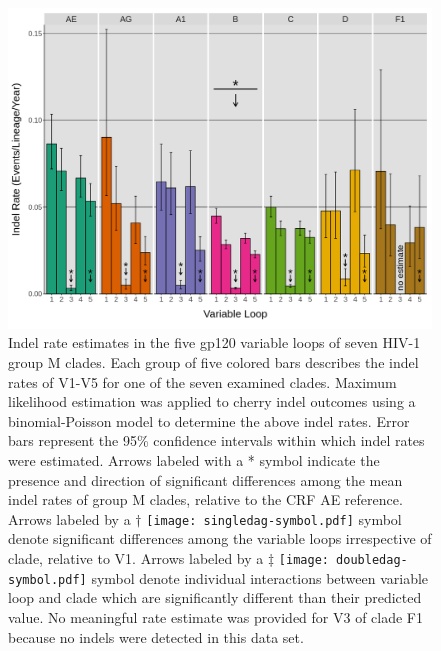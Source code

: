 \documentclass[12pt]{article}
\newcommand*{\doubledag}[2]{\texttt{[image: doubledag-symbol.pdf]}} %
\newcommand*{\singledag}[2]{\texttt{[image: singledag-symbol.pdf]}} %
\providecommand{\DIFadd}[1]{{\protect\color{blue}\uwave{#1}}} %
\providecommand{\DIFdel}[1]{{\protect\color{red}\sout{#1}}}                      %
\providecommand{\DIFaddFL}[1]{\DIFadd{#1}} %
\providecommand{\DIFdelFL}[1]{\DIFdel{#1}} %
\providecommand{\DIFaddbeginFL}{} %
\providecommand{\DIFaddendFL}{} %
\providecommand{\DIFdelbeginFL}{} %
\providecommand{\DIFdelendFL}{} %
\newcommand{\DIFscaledelfig}{0.5}
\newlength{\DIFdelgraphicswidth} %
\newlength{\DIFdelgraphicsheight} %
\newcommand{\DIFaddincludegraphics}[2][]{{\color{blue}\fbox{\DIFOincludegraphics[#1]{#2}}}} %
\newcommand{\DIFdelincludegraphics}[2][]{%
\sbox{\DIFdelgraphicsbox}{\DIFOincludegraphics[#1]{#2}}%
\settoboxwidth{\DIFdelgraphicswidth}{\DIFdelgraphicsbox} %
\settoboxtotalheight{\DIFdelgraphicsheight}{\DIFdelgraphicsbox} %
\scalebox{\DIFscaledelfig}{%
\parbox[b]{\DIFdelgraphicswidth}{\usebox{\DIFdelgraphicsbox}\\[-\baselineskip] \rule{\DIFdelgraphicswidth}{0em}}\llap{\resizebox{\DIFdelgraphicswidth}{\DIFdelgraphicsheight}{%
\setlength{\unitlength}{\DIFdelgraphicswidth}%
\begin{picture}(1,1)%
\thicklines\linethickness{2pt} %
{\color[rgb]{1,0,0}\put(0,0){\framebox(1,1){}}}%
{\color[rgb]{1,0,0}\put(0,0){\line( 1,1){1}}}%
{\color[rgb]{1,0,0}\put(0,1){\line(1,-1){1}}}%
\end{picture}%
}\hspace*{3pt}}} %
} %
\DeclareRobustCommand{\DIFaddbeginFL}{\DIFOaddbeginFL \let\includegraphics\DIFaddincludegraphics} %
\DeclareRobustCommand{\DIFaddendFL}{\DIFOaddendFL \let\includegraphics\DIFOincludegraphics} %
\DeclareRobustCommand{\DIFdelbeginFL}{\DIFOdelbeginFL \let\includegraphics\DIFdelincludegraphics} %
\DeclareRobustCommand{\DIFdelendFL}{\DIFOaddendFL \let\includegraphics\DIFOincludegraphics} %
\begin{document}
\begin{figure}[htbp]
    \centering
    \includegraphics[width=.85\textwidth]{indel-rates}
    \caption{ 
    Indel rate estimates in the five gp120 variable loops of seven HIV-1 group M clades. 
    Each group of five colored bars describes the indel rates of V1-V5 for one of the seven examined clades. 
    Maximum likelihood estimation was applied to cherry indel outcomes using a binomial-Poisson model to determine the above indel rates. 
    Error bars represent the 95\% confidence intervals within which indel rates were estimated. 
    Arrows labeled with a * symbol indicate the presence and direction of significant differences among the mean indel rates of group M clades, relative to the CRF \DIFaddbeginFL \DIFaddFL{01\_}\DIFaddendFL AE reference. 
    Arrows labeled by a \DIFdelbeginFL \DIFdelFL{$\dagger$ }\DIFdelendFL \DIFaddbeginFL \protect\singledag{2.9mm}{2.8mm} \DIFaddendFL symbol denote significant differences among the variable loops irrespective of clade, relative to V1.  
    Arrows labeled by a \DIFdelbeginFL \DIFdelFL{$\ddagger$ }\DIFdelendFL \DIFaddbeginFL \protect\doubledag{2.9mm}{2.8mm} \DIFaddendFL symbol denote individual interactions between variable loop and clade which are significantly different than their predicted value.
    No meaningful rate estimate was provided for V3 of clade F1 because no indels were detected in this data set.   
    }
    \label{indel-rates}
\end{figure}



\end{document}

